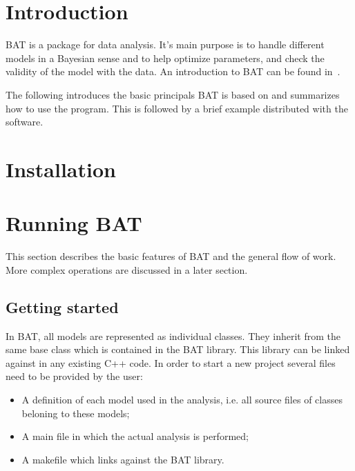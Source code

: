 \documentclass[11pt, a4paper]{article}
\begin{document}
\section{Introduction}
\label{section:introduction}

{\sc BAT} is a package for data analysis. It's main purpose is to
handle different models in a Bayesian sense and to help optimize
parameters, and check the validity of the model with the data. An
introduction to {\sc BAT} can be found in~\cite{Caldwell:2008fw}.

The following introduces the basic principals {\sc BAT} is based on
and summarizes how to use the program. This is followed by a brief
example distributed with the software.

\section{Installation}
\label{section:installation}

\section{Running BAT}
\label{section:runningBAT}

This section describes the basic features of {\sc BAT} and the general
flow of work. More complex operations are discussed in a later
section.

\subsection{Getting started}

In {\sc BAT}, all models are represented as individual classes. They
inherit from the same base class which is contained in the {\sc BAT}
library. This library can be linked against in any existing C++
code. In order to start a new project several files need to be
provided by the user:
%
\begin{itemize}
\item A definition of each model used in the analysis, i.e. all source
  files of classes beloning to these models;
\item A main file in which the actual analysis is performed;
\item A makefile which links against the {\sc BAT} library.
\end{itemize}
\end{document}
